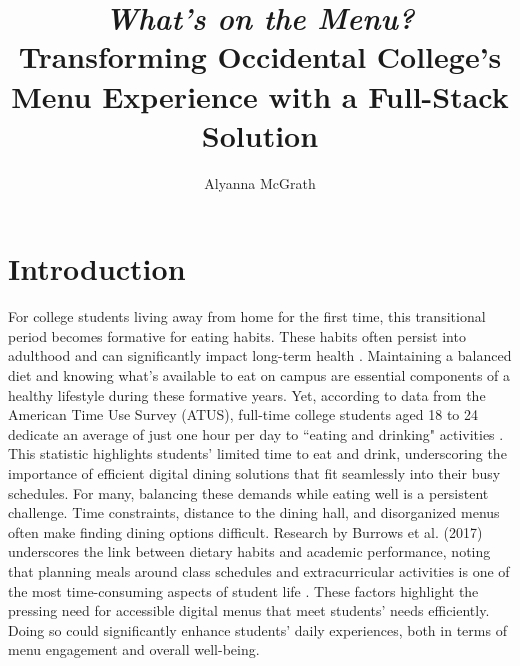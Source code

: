 \documentclass[10pt,twocolumn]{article}
\title{ \textit{What's on the Menu?} Transforming Occidental College's Menu Experience with a Full-Stack Solution
} %
\author{Alyanna McGrath}
\affiliation{Occidental College}
\begin{document}
\maketitle

\section{Introduction}

For college students living away from home for the first time, this transitional period becomes formative for eating habits. These habits often persist into adulthood and can significantly impact long-term health \cite{Norhaya2023}. Maintaining a balanced diet and knowing what’s available to eat on campus are essential components of a healthy lifestyle during these formative years. Yet, according to data from the American Time Use Survey (ATUS), full-time college students aged 18 to 24 dedicate an average of just one hour per day to ``eating and drinking" activities \cite{NewEngland2011}. This statistic highlights students' limited time to eat and drink, underscoring the importance of efficient digital dining solutions that fit seamlessly into their busy schedules. For many, balancing these demands while eating well is a persistent challenge. Time constraints, distance to the dining hall, and disorganized menus often make finding dining options difficult. Research by Burrows et al. (2017) underscores the link between dietary habits and academic performance, noting that planning meals around class schedules and extracurricular activities is one of the most time-consuming aspects of student life \cite{Burrows2017}. These factors highlight the pressing need for accessible digital menus that meet students' needs efficiently.
Doing so could significantly enhance students' daily experiences, both in terms of menu engagement and overall well-being.
\end{document}
